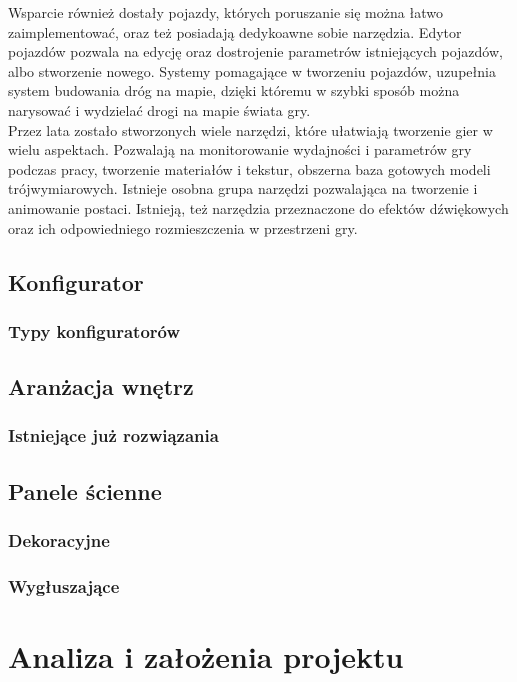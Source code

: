 \documentclass{article} %
\begin{document}
        Wsparcie również dostały pojazdy, których poruszanie się można łatwo zaimplementować, oraz też posiadają dedykoawne sobie narzędzia. Edytor pojazdów pozwala na edycję oraz dostrojenie parametrów istniejących pojazdów, albo stworzenie nowego. Systemy pomagające w tworzeniu pojazdów, uzupełnia system budowania dróg na mapie, dzięki któremu w szybki sposób można narysować i wydzielać drogi na mapie świata gry.
        \\
        
        Przez lata zostało stworzonych wiele narzędzi, które ułatwiają tworzenie gier w wielu aspektach. Pozwalają na monitorowanie wydajności i parametrów gry podczas pracy, tworzenie materiałów i tekstur, obszerna baza gotowych modeli trójwymiarowych. Istnieje osobna grupa narzędzi pozwalająca na tworzenie i animowanie postaci. Istnieją, też narzędzia przeznaczone do efektów dźwiękowych oraz ich odpowiedniego rozmieszczenia w przestrzeni gry.
        \\
        
        
        
    \subsection{Konfigurator}
        \subsubsection{Typy konfiguratorów}
    
    \subsection{Aranżacja wnętrz}
        \subsubsection{Istniejące już rozwiązania}
    \subsection{Panele ścienne}
        \subsubsection{Dekoracyjne}
        \subsubsection{Wygłuszające}
\section{Analiza i założenia projektu}
\end{document}
